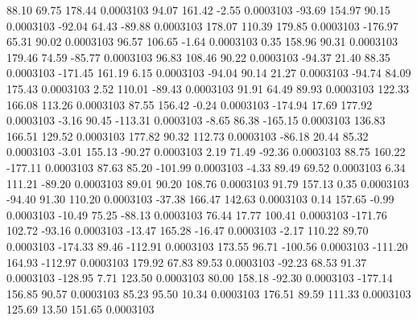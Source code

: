        88.10       69.75      178.44     0.0003103
       94.07      161.42       -2.55     0.0003103
      -93.69      154.97       90.15     0.0003103
      -92.04       64.43      -89.88     0.0003103
      178.07      110.39      179.85     0.0003103
     -176.97       65.31       90.02     0.0003103
       96.57      106.65       -1.64     0.0003103
        0.35      158.96       90.31     0.0003103
      179.46       74.59      -85.77     0.0003103
       96.83      108.46       90.22     0.0003103
      -94.37       21.40       88.35     0.0003103
     -171.45      161.19        6.15     0.0003103
      -94.04       90.14       21.27     0.0003103
      -94.74       84.09      175.43     0.0003103
        2.52      110.01      -89.43     0.0003103
       91.91       64.49       89.93     0.0003103
      122.33      166.08      113.26     0.0003103
       87.55      156.42       -0.24     0.0003103
     -174.94       17.69      177.92     0.0003103
       -3.16       90.45     -113.31     0.0003103
       -8.65       86.38     -165.15     0.0003103
      136.83      166.51      129.52     0.0003103
      177.82       90.32      112.73     0.0003103
      -86.18       20.44       85.32     0.0003103
       -3.01      155.13      -90.27     0.0003103
        2.19       71.49      -92.36     0.0003103
       88.75      160.22     -177.11     0.0003103
       87.63       85.20     -101.99     0.0003103
       -4.33       89.49       69.52     0.0003103
        6.34      111.21      -89.20     0.0003103
       89.01       90.20      108.76     0.0003103
       91.79      157.13        0.35     0.0003103
      -94.40       91.30      110.20     0.0003103
      -37.38      166.47      142.63     0.0003103
        0.14      157.65       -0.99     0.0003103
      -10.49       75.25      -88.13     0.0003103
       76.44       17.77      100.41     0.0003103
     -171.76      102.72      -93.16     0.0003103
      -13.47      165.28      -16.47     0.0003103
       -2.17      110.22       89.70     0.0003103
     -174.33       89.46     -112.91     0.0003103
      173.55       96.71     -100.56     0.0003103
     -111.20      164.93     -112.97     0.0003103
      179.92       67.83       89.53     0.0003103
      -92.23       68.53       91.37     0.0003103
     -128.95        7.71      123.50     0.0003103
       80.00      158.18      -92.30     0.0003103
     -177.14      156.85       90.57     0.0003103
       85.23       95.50       10.34     0.0003103
      176.51       89.59      111.33     0.0003103
      125.69       13.50      151.65     0.0003103
